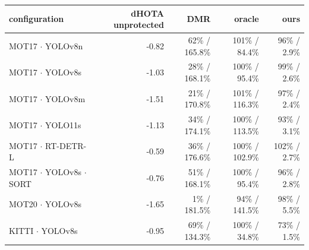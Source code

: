 \begin{tabular}{lrrrr}
\toprule
configuration & dHOTA unprotected & DMR & oracle & ours \\
\midrule
MOT17 $\cdot$ YOLOv8n & -0.82 & 62\% / 165.8\% & 101\% / 84.4\% & 96\% / 2.9\% \\
MOT17 $\cdot$ YOLOv8s & -1.03 & 28\% / 168.1\% & 100\% / 95.4\% & 99\% / 2.6\% \\
MOT17 $\cdot$ YOLOv8m & -1.51 & 21\% / 170.8\% & 101\% / 116.3\% & 97\% / 2.4\% \\
MOT17 $\cdot$ YOLO11s & -1.13 & 34\% / 174.1\% & 100\% / 113.5\% & 93\% / 3.1\% \\
MOT17 $\cdot$ RT-DETR-L & -0.59 & 36\% / 176.6\% & 100\% / 102.9\% & 102\% / 2.7\% \\
MOT17 $\cdot$ YOLOv8s $\cdot$ SORT & -0.76 & 51\% / 168.1\% & 100\% / 95.4\% & 96\% / 2.8\% \\
MOT20 $\cdot$ YOLOv8s & -1.65 & 1\% / 181.5\% & 94\% / 141.5\% & 98\% / 5.5\% \\
KITTI $\cdot$ YOLOv8s & -0.95 & 69\% / 134.3\% & 100\% / 34.8\% & 73\% / 1.5\% \\
\bottomrule
\end{tabular}
